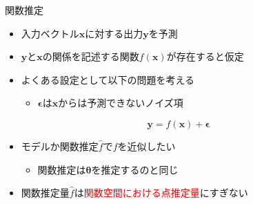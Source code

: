 \documentclass[dvipdfmx, 10pt]{beamer}
\begin{document}
\begin{frame}{関数推定}
  \begin{itemize}
    \item 入力ベクトル$\bm{x}$に対する出力$\bm{y}$を予測
    \item $\bm{y}$と$\bm{x}$の関係を記述する関数$f(\bm{x})$が存在すると仮定
    \item よくある設定として以下の問題を考える
    \begin{itemize}
      \item $\bm{\epsilon}$は$\bm{x}$からは予測できないノイズ項
    \end{itemize}
  \end{itemize}
  \begin{equation}
    \bm{y} = f(\bm{x}) + \bm{\epsilon}
  \end{equation}
  \begin{itemize}
    \item モデルか関数推定$\hat{f}$で$f$を近似したい
    \begin{itemize}
      \item 関数推定は$\bm{\theta}$を推定するのと同じ
    \end{itemize}
  \item 関数推定量$\hat{f}$は\textcolor{red}{関数空間における点推定量}にすぎない
  \end{itemize}
\end{frame}

\end{document}
